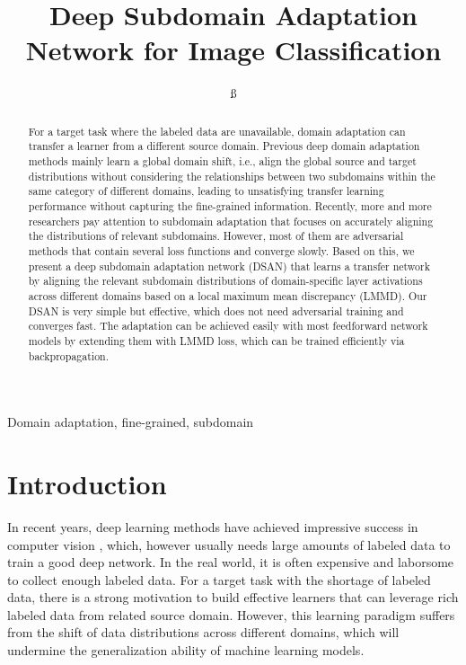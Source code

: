 \documentclass[conference]{IEEEtran}
\begin{document}
\title{Deep Subdomain Adaptation Network for Image Classification}

\author{
ß
}

\maketitle

\begin{abstract}
For a target task where the labeled data are unavailable, domain adaptation can transfer a learner from a different source domain.
Previous deep domain adaptation methods mainly learn a global domain shift, i.e., align the global source and target distributions without considering the relationships between two subdomains 
within the same category of different domains, leading to unsatisfying transfer learning performance without capturing the fine-grained information.
Recently, more and more researchers pay attention to subdomain adaptation that focuses on accurately aligning the distributions of relevant subdomains.
However, most of them are adversarial methods that contain several loss functions and converge slowly.
Based on this, we present a deep subdomain adaptation network (DSAN) that learns a transfer network by aligning the relevant subdomain distributions of domain-specific layer activations across different domains based on a local maximum mean discrepancy (LMMD).
Our DSAN is very simple but effective, which does not need adversarial training and converges fast. The adaptation can be achieved easily with most feedforward network models by extending them with LMMD loss, which can be trained efficiently via backpropagation. 
\end{abstract}

\begin{IEEEkeywords}
Domain adaptation, fine-grained, subdomain
\end{IEEEkeywords}

\section{Introduction}
In recent years, deep learning methods have achieved impressive success in computer vision \cite{b1}, which, however usually needs large amounts of labeled data to train a good deep network.
In the real world, it is often expensive and laborsome to collect enough labeled data. For a target task with the shortage of labeled data, there is a strong motivation to build effective learners that can leverage rich labeled data from related source domain.
However, this learning paradigm suffers from the shift of data distributions across different domains, which will undermine the generalization ability of machine learning models.
\end{document}
